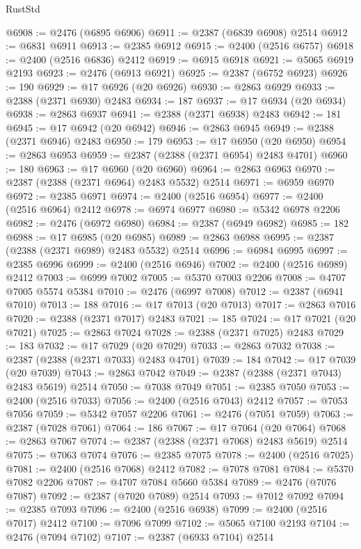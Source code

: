 \begin{lexlean}{RustStd}
\begin{coremodule}
{\begin{coremodule}
{{{{{{{{{{{{{{{{{{{{{{{{{{{{{{{{{{{{{{{{{{{{{{{{{{@6908 := @2476 (@6895 @6906)
@6911 := @2387 (@6839 @6908) @2514
@6912 := @6831 @6911
@6913 := @2385 @6912
@6915 := @2400 (@2516 @6757)
@6918 := @2400 (@2516 @6836) @2412
@6919 := @6915 @6918
@6921 := @5065 @6919 @2193
@6923 := @2476 (@6913 @6921)
@6925 := @2387 (@6752 @6923)
@6926 := 190
@6929 := @17 @6926 (@20 @6926)
@6930 := @2863 @6929
@6933 := @2388 (@2371 @6930) @2483
@6934 := 187
@6937 := @17 @6934 (@20 @6934)
@6938 := @2863 @6937
@6941 := @2388 (@2371 @6938) @2483
@6942 := 181
@6945 := @17 @6942 (@20 @6942)
@6946 := @2863 @6945
@6949 := @2388 (@2371 @6946) @2483
@6950 := 179
@6953 := @17 @6950 (@20 @6950)
@6954 := @2863 @6953
@6959 := @2387 (@2388 (@2371 @6954) @2483 @4701)
@6960 := 180
@6963 := @17 @6960 (@20 @6960)
@6964 := @2863 @6963
@6970 := @2387 (@2388 (@2371 @6964) @2483 @5532) @2514
@6971 := @6959 @6970
@6972 := @2385 @6971
@6974 := @2400 (@2516 @6954)
@6977 := @2400 (@2516 @6964) @2412
@6978 := @6974 @6977
@6980 := @5342 @6978 @2206
@6982 := @2476 (@6972 @6980)
@6984 := @2387 (@6949 @6982)
@6985 := 182
@6988 := @17 @6985 (@20 @6985)
@6989 := @2863 @6988
@6995 := @2387 (@2388 (@2371 @6989) @2483 @5532) @2514
@6996 := @6984 @6995
@6997 := @2385 @6996
@6999 := @2400 (@2516 @6946)
@7002 := @2400 (@2516 @6989) @2412
@7003 := @6999 @7002
@7005 := @5370 @7003 @2206
@7008 := @4707 @7005 @5574 @5384
@7010 := @2476 (@6997 @7008)
@7012 := @2387 (@6941 @7010)
@7013 := 188
@7016 := @17 @7013 (@20 @7013)
@7017 := @2863 @7016
@7020 := @2388 (@2371 @7017) @2483
@7021 := 185
@7024 := @17 @7021 (@20 @7021)
@7025 := @2863 @7024
@7028 := @2388 (@2371 @7025) @2483
@7029 := 183
@7032 := @17 @7029 (@20 @7029)
@7033 := @2863 @7032
@7038 := @2387 (@2388 (@2371 @7033) @2483 @4701)
@7039 := 184
@7042 := @17 @7039 (@20 @7039)
@7043 := @2863 @7042
@7049 := @2387 (@2388 (@2371 @7043) @2483 @5619) @2514
@7050 := @7038 @7049
@7051 := @2385 @7050
@7053 := @2400 (@2516 @7033)
@7056 := @2400 (@2516 @7043) @2412
@7057 := @7053 @7056
@7059 := @5342 @7057 @2206
@7061 := @2476 (@7051 @7059)
@7063 := @2387 (@7028 @7061)
@7064 := 186
@7067 := @17 @7064 (@20 @7064)
@7068 := @2863 @7067
@7074 := @2387 (@2388 (@2371 @7068) @2483 @5619) @2514
@7075 := @7063 @7074
@7076 := @2385 @7075
@7078 := @2400 (@2516 @7025)
@7081 := @2400 (@2516 @7068) @2412
@7082 := @7078 @7081
@7084 := @5370 @7082 @2206
@7087 := @4707 @7084 @5660 @5384
@7089 := @2476 (@7076 @7087)
@7092 := @2387 (@7020 @7089) @2514
@7093 := @7012 @7092
@7094 := @2385 @7093
@7096 := @2400 (@2516 @6938)
@7099 := @2400 (@2516 @7017) @2412
@7100 := @7096 @7099
@7102 := @5065 @7100 @2193
@7104 := @2476 (@7094 @7102)
@7107 := @2387 (@6933 @7104) @2514
}}}}}}}}}}}}}}}}}}}}}}}}}}}}}}}}}}}}}}}}}}}}}}}}}}
\end{coremodule}}
\end{coremodule}
\end{lexlean}
